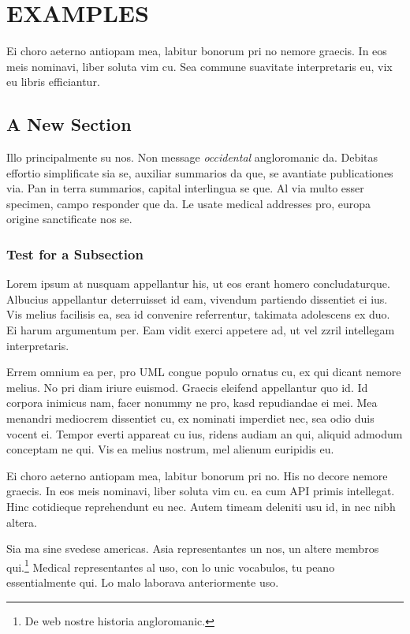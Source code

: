 \chapter{EXAMPLES}\label{ch:examples}
Ei choro aeterno antiopam mea, labitur bonorum pri no 
nemore graecis. In eos meis nominavi, liber soluta vim cu. Sea commune
suavitate interpretaris eu, vix eu libris efficiantur.
\section*{A New Section}
Illo principalmente su nos. Non message \emph{occidental} angloromanic
da. Debitas effortio simplificate sia se, auxiliar summarios da que,
se avantiate publicationes via. Pan in terra summarios, capital
interlingua se que. Al via multo esser specimen, campo responder que
da. Le usate medical addresses pro, europa origine sanctificate nos
se.


\subsection*{Test for a Subsection}
Lorem ipsum at nusquam appellantur his, ut eos erant homero
concludaturque. Albucius appellantur deterruisset id eam, vivendum
partiendo dissentiet ei ius. Vis melius facilisis ea, sea id convenire
referrentur, takimata adolescens ex duo. Ei harum argumentum per. Eam
vidit exerci appetere ad, ut vel zzril intellegam interpretaris.

Errem omnium ea per, pro \ac{UML} congue populo ornatus cu, ex qui
dicant nemore melius. No pri diam iriure euismod. Graecis eleifend
appellantur quo id. Id corpora inimicus nam, facer nonummy ne pro,
kasd repudiandae ei mei. Mea menandri mediocrem dissentiet cu, ex
nominati imperdiet nec, sea odio duis vocent ei. Tempor everti
appareat cu ius, ridens audiam an qui, aliquid admodum conceptam ne
qui. Vis ea melius nostrum, mel alienum euripidis eu.

Ei choro aeterno antiopam mea, labitur bonorum pri no. His no decore
nemore graecis. In eos meis nominavi, liber soluta vim cu.
ea cum \ac{API} primis intellegat. Hinc cotidieque reprehendunt eu
nec. Autem timeam deleniti usu id, in nec nibh altera.

Sia ma sine svedese americas. Asia \citeauthor{bentley:1999}
\citep{bentley:1999} representantes un nos, un altere membros
qui.\footnote{De web nostre historia angloromanic.} Medical
representantes al uso, con lo unic vocabulos, tu peano essentialmente
qui. Lo malo laborava anteriormente uso.

